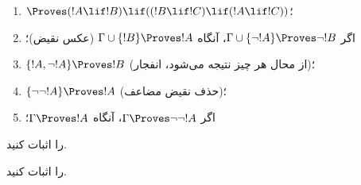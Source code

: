 \documentclass[../../../include/open-logic-section]{subfiles}
\begin{document}
\begin{prop}
\begin{enumerate}
\item $\Proves (!A \lif !B) \lif ((!B \lif !C)
  \lif (!A \lif !C))$؛ 
\item اگر $\Gamma \cup \{ \lnot !A\}
  \Proves \lnot !B$، آنگاه $\Gamma \cup \{ !B\} \Proves
  !A$ (عکس نقیض)؛ 
\item $\{ !A, \lnot!A\} \Proves
    !B$ (از محال هر چیز نتیجه می‌شود، انفجار)؛ 
\item $\{ \lnot\lnot!A\} \Proves
  !A$ (حذف نقیض مضاعف)؛
\item اگر $\Gamma \Proves \lnot\lnot!A$، آنگاه $\Gamma \Proves
  !A$؛
\end{enumerate}
\end{prop}

\begin{prob}
   را اثبات کنید.
\end{prob}
\tagendprob

\begin{prob}
   را اثبات کنید.
\end{prob}
\tagendprob
\end{document}
